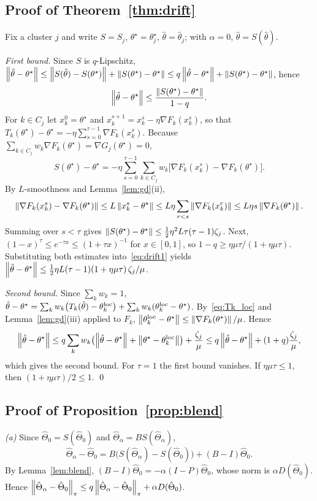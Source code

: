 \subsection{Proof of Theorem~\ref{thm:drift}}
Fix a cluster $j$ and write $S=S_j$, $\theta^\star=\theta^\star_j$, $\hat\theta=\hat\theta_j$;
with $\alpha=0$, $\hat\theta=S(\hat\theta)$.

\emph{First bound.} Since $S$ is $q$-Lipschitz,
$\left\lVert \hat\theta-\theta^\star \right\rVert\le\left\lVert S(\hat\theta)-S(\theta^\star) \right\rVert+\left\lVert S(\theta^\star)-\theta^\star \right\rVert\le q\left\lVert \hat\theta-\theta^\star \right\rVert+\left\lVert S(\theta^\star)-\theta^\star \right\rVert$,
hence
\begin{equation}
  \left\lVert \hat\theta-\theta^\star \right\rVert\le\frac{\left\lVert S(\theta^\star)-\theta^\star \right\rVert}{1-q}.
  \label{eq:drift1}
\end{equation}
For $k\in C_j$ let $x_k^0=\theta^\star$ and $x_k^{s+1}=x_k^s-\eta\nabla F_k(x_k^s)$, so that
$T_k(\theta^\star)-\theta^\star=-\eta\sum_{s=0}^{\tau-1}\nabla F_k(x_k^s)$. Because
$\sum_{k\in C_j}w_k\nabla F_k(\theta^\star)=\nabla G_j(\theta^\star)=0$,
\[
  S(\theta^\star)-\theta^\star=-\eta\sum_{s=0}^{\tau-1}\sum_{k\in C_j}w_k\bigl[\nabla F_k(x_k^s)-\nabla F_k(\theta^\star)\bigr].
\]
By $L$-smoothness and Lemma~\ref{lem:gd}(ii),
\[
  \left\lVert \nabla F_k(x_k^s)-\nabla F_k(\theta^\star) \right\rVert\le L\left\lVert x_k^s-\theta^\star \right\rVert
  \le L\eta\sum_{r<s}\left\lVert \nabla F_k(x_k^r) \right\rVert\le L\eta s\left\lVert \nabla F_k(\theta^\star) \right\rVert .
\]
Summing over $s<\tau$ gives $\left\lVert S(\theta^\star)-\theta^\star \right\rVert\le\frac12\eta^2L\tau(\tau-1)\zeta_j$.
Next, $(1-x)^\tau\le e^{-\tau x}\le(1+\tau x)^{-1}$ for $x\in[0,1]$, so
$1-q\ge\eta\mu\tau/(1+\eta\mu\tau)$. Substituting both estimates into~\eqref{eq:drift1}
yields $\left\lVert \hat\theta-\theta^\star \right\rVert\le\frac12\eta L(\tau-1)(1+\eta\mu\tau)\,\zeta_j/\mu$.

\emph{Second bound.} Since $\sum_kw_k=1$,
$\hat\theta-\theta^\star=\sum_{k}w_k\bigl(T_k(\hat\theta)-\theta_k^{\mathrm{loc}}\bigr)+\sum_kw_k(\theta^{\mathrm{loc}}_k-\theta^\star)$.
By~\eqref{eq:Tk_loc} and Lemma~\ref{lem:gd}(iii) applied to $F_k$,
$\left\lVert \theta_k^{\mathrm{loc}}-\theta^\star \right\rVert\le\left\lVert \nabla F_k(\theta^\star) \right\rVert/\mu$. Hence
\[
  \left\lVert \hat\theta-\theta^\star \right\rVert\le q\sum_kw_k\bigl(\left\lVert \hat\theta-\theta^\star \right\rVert+\left\lVert \theta^\star-\theta_k^{\mathrm{loc}} \right\rVert\bigr)+\frac{\zeta_j}{\mu}
  \le q\left\lVert \hat\theta-\theta^\star \right\rVert+(1+q)\frac{\zeta_j}{\mu},
\]
which gives the second bound. For $\tau=1$ the first bound vanishes. If
$\eta\mu\tau\le1$, then $(1+\eta\mu\tau)/2\le1$.
\qed

\subsection{Proof of Proposition~\ref{prop:blend}}
\emph{(a)} Since $\hat\Theta_0=S(\hat\Theta_0)$ and $\hat\Theta_\alpha=BS(\hat\Theta_\alpha)$,
\[
  \hat\Theta_\alpha-\hat\Theta_0=B\bigl(S(\hat\Theta_\alpha)-S(\hat\Theta_0)\bigr)+(B-I)\hat\Theta_0 .
\]
By Lemma~\ref{lem:blend}, $(B-I)\hat\Theta_0=-\alpha(I-P)\hat\Theta_0$, whose norm is
$\alpha D(\hat\Theta_0)$. Hence
$\left\lVert \hat\Theta_\alpha-\hat\Theta_0 \right\rVert_{\pi}\le q\left\lVert \hat\Theta_\alpha-\hat\Theta_0 \right\rVert_{\pi}+\alpha D(\hat\Theta_0)$.

